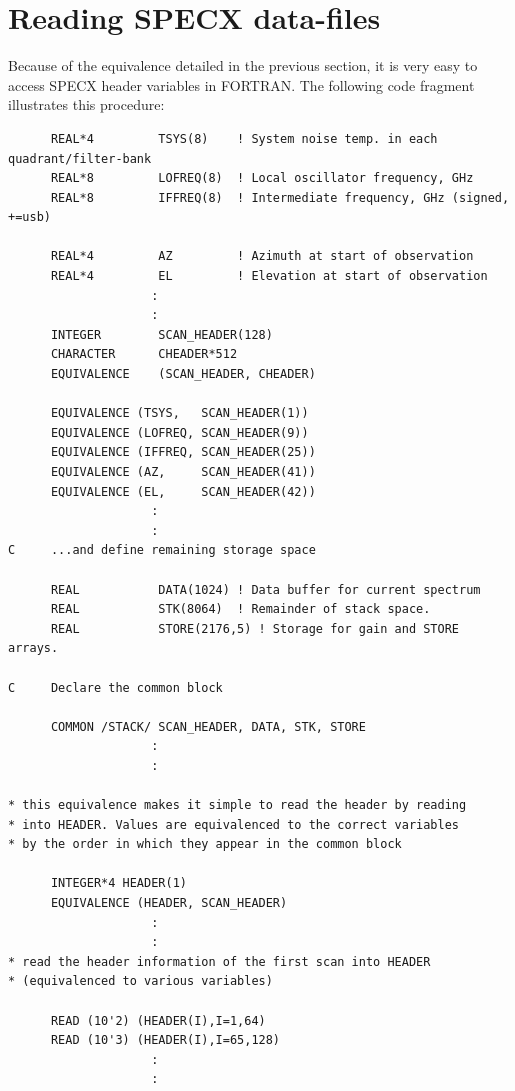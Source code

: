 \documentclass[11pt,twoside]{report}
\begin{document}
\section{Reading SPECX data-files} 

Because of the equivalence detailed in the previous section, it is very easy to
access SPECX header variables in FORTRAN. The following code fragment
illustrates this procedure: 

\begin{verbatim}
      REAL*4         TSYS(8)    ! System noise temp. in each quadrant/filter-bank
      REAL*8         LOFREQ(8)  ! Local oscillator frequency, GHz
      REAL*8         IFFREQ(8)  ! Intermediate frequency, GHz (signed, +=usb)

      REAL*4         AZ         ! Azimuth at start of observation
      REAL*4         EL         ! Elevation at start of observation
                    :
                    :
      INTEGER        SCAN_HEADER(128)
      CHARACTER      CHEADER*512
      EQUIVALENCE    (SCAN_HEADER, CHEADER)

      EQUIVALENCE (TSYS,   SCAN_HEADER(1))
      EQUIVALENCE (LOFREQ, SCAN_HEADER(9))
      EQUIVALENCE (IFFREQ, SCAN_HEADER(25))
      EQUIVALENCE (AZ,     SCAN_HEADER(41))
      EQUIVALENCE (EL,     SCAN_HEADER(42))
                    :
                    :
C     ...and define remaining storage space

      REAL           DATA(1024) ! Data buffer for current spectrum
      REAL           STK(8064)  ! Remainder of stack space.
      REAL           STORE(2176,5) ! Storage for gain and STORE arrays.

C     Declare the common block

      COMMON /STACK/ SCAN_HEADER, DATA, STK, STORE
                    :
                    :

* this equivalence makes it simple to read the header by reading
* into HEADER. Values are equivalenced to the correct variables
* by the order in which they appear in the common block

      INTEGER*4 HEADER(1)
      EQUIVALENCE (HEADER, SCAN_HEADER)
                    :
                    :
* read the header information of the first scan into HEADER 
* (equivalenced to various variables)
      
      READ (10'2) (HEADER(I),I=1,64)
      READ (10'3) (HEADER(I),I=65,128)
                    :
                    :
\end{verbatim}
\end{document}
